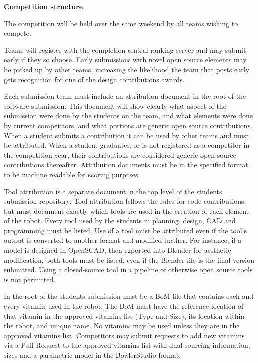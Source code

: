 \documentclass{article}
\begin{document}
 \pagebreak

{\huge \textbf{Competition structure}}

The competition will be held over the same weekend by all teams wishing to compete. 

Teams will register with the completion central ranking server and may submit early if they so choose. Early submissions with novel open source elements may be picked up by other teams, increasing the likelihood the team that posts early gets recognition for one of the design contributions awards.

Each submission team must include an attribution document in the root of the software submission. This document will show clearly what aspect of the submission were done by the students on the team, and what elements were done by current competitors, and what portions are generic open source contributions. When a student submits a contribution it can be used by other teams and must be attributed. When a student graduates, or is not registered as a competitor in the competition year, their contributions are considered generic open source contributions thereafter.  Attribution documents must be in the specified format to be machine readable for scoring purposes. 

Tool attribution is a separate document in the top level of the students submission repository. Tool attribution follows the rules for code contributions, but must document exactly which tools are used in the creation of each element of the robot. Every tool used by the students in planning, design, CAD and programming must be listed. Use of a tool must be attributed even if the tool's output is converted to another format and modified further. For instance, if a model is designed in OpenSCAD, then exported into Blender for aesthetic modification, both tools must be listed, even if the Blender file is the final version submitted. Using a closed-source tool in a pipeline of otherwise open source tools is not permitted. 

In the root of the students submission must be a BoM file that contains each and every vitamin used in the robot. The BoM must have the reference location of that vitamin in the approved vitamins list (Type and Size), its location within the robot, and unique name. No vitamins may be used unless they are in the approved vitamins list. Competitors may submit requests to add new vitamins via a Pull Request to the approved vitamins list with dual sourcing information, sizes and a parametric model in the BowlerStudio format. 
\end{document}
